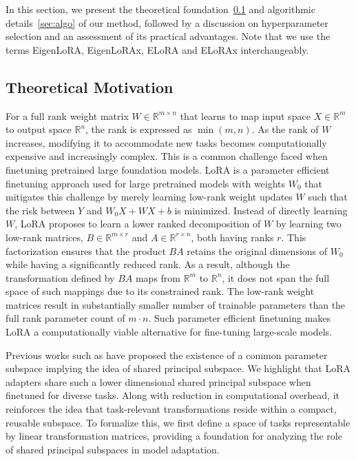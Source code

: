 In this section, we present the theoretical foundation~\cref{sec:theory} and algorithmic details~\cref{sec:algo} of our method, followed by a discussion on hyperparameter selection and an assessment of its practical advantages. Note that we use the terms EigenLoRA, EigenLoRAx, ELoRA and ELoRAx interchangeably.

\subsection{Theoretical Motivation}
\label{sec:theory}

For a full rank weight matrix $W \in \mathbb{R}^{m \times n} $ that learns to map input space $X\in\mathbb{R}^{m}$ to output space $\mathbb{R}^{n}$, the rank is expressed as $\min(m,n)$. As the rank of $ W $ increases, modifying it to accommodate new tasks becomes computationally expensive and increasingly complex. This is a common challenge faced when finetuning pretrained large foundation models. LoRA is a parameter efficient finetuning approach used for large pretrained models with weights $W_0$ that mitigates this challenge by merely learning low-rank weight updates $W$ such that the risk between $Y$ and $W_0X + WX + b$ is minimized. Instead of directly learning $W$, LoRA proposes to learn a lower ranked decomposition of $W$ by learning two low-rank matrices, $ B \in \mathbb{R}^{m \times r} $ and $ A \in \mathbb{R}^{r \times n} $, both having ranks $r$.  This factorization ensures that the product $ BA $ retains the original dimensions of $ W_0 $ while having a significantly reduced rank.
As a result, although the transformation defined by $ BA $ maps from $ \mathbb{R}^m $ to $ \mathbb{R}^n $, it does not span the full space of such mappings due to its constrained rank. The low-rank weight matrices result in substantially smaller number of trainable parameters than the full rank parameter count of $m\cdot n$. Such parameter efficient finetuning makes LoRA a computationally viable alternative for fine-tuning large-scale models.    

Previous works such as \cite{meng_pissa_2024, dora} have proposed the existence of a common parameter subspace implying the idea of shared principal subspace. We highlight that LoRA adapters share such a lower dimensional shared principal subspace when finetuned for diverse tasks. Along with reduction in computational overhead, it reinforces the idea that task-relevant transformations reside within a compact, reusable subspace. To formalize this, we first define a space of tasks representable by linear transformation matrices, providing a foundation for analyzing the role of shared principal subspaces in model adaptation.


